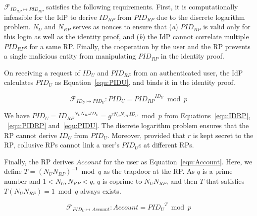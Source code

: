 $\mathcal{F}_{ID_{RP} \mapsto PID_{RP}}$ satisfies the following requirements. %
First,
it is computationally infeasible for
    the IdP to derive $ID_{RP}$ from $PID_{RP}$ due to the discrete logarithm problem.
$N_{U}$ and $N_{RP}$  serves as nonces to ensure that (\emph{a}) $PID_{RP}$ is valid only for this login as well as the identity proof,
     and (\emph{b}) the IdP cannot correlate multiple ${PID_{RP}}$s for a same RP.
Finally,
    the cooperation by the user and the RP prevents a single malicious entity from manipulating $PID_{RP}$ in the identity proof.

On receiving a request of
    $ID_U$ and $PID_{RP}$ from an authenticated user,
the IdP calculates $PID_U$ as Equation~\ref{equ:PIDU},
    and binds it in the identity proof.

\begin{equation}
 \mathcal{F}_{ID_{U} \mapsto PID_{U}}: PID_U = {PID_{RP}}^{ID_U} \bmod p
 \label{equ:PIDU}
\end{equation}

We have $PID_U = {ID_{RP}}^{N_UN_{RP}ID_U}  = g^{rN_UN_{RP}ID_U} \bmod p$ from Equations~\ref{equ:IDRP}, ~\ref{equ:PIDRP} and~\ref{equ:PIDU}.
The discrete logarithm problem ensures that the RP cannot derive $ID_U$ from $PID_U$.
Moreover,
    provided that $r$ is kept secret to the RP,
    collusive RPs cannot link a user's $PID_U$s at different RPs.

Finally, the RP derives $Account$ for the user %
 as Equation~\ref{equ:Account}.
Here, we define $T = (N_UN_{RP})^{-1} \bmod q$ as the trapdoor at the RP.
As $q$ is a prime number and $1< N_U, N_{RP} < q$, $q$ is coprime to $N_U N_{RP}$, and then $T$ that satisfies $T (N_U N_{RP}) = 1 \bmod q$ always exists.

\begin{equation}
   \mathcal{F}_{PID_{U} \mapsto Account}: Account = {PID_U}^{T} \bmod p
   \label{equ:Account}
   \end{equation}


